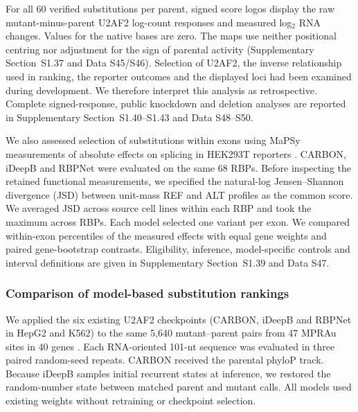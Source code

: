 \documentclass[webpdf,contemporary,large]{current_assets/oup-authoring-template}
\newcommand{\supsect}[1]{Supplementary Section~#1}
\begin{document}
For all 60 verified substitutions per parent, signed score logos \citep{dey2018edlogo} display the raw mutant-minus-parent U2AF2 log-count responses and measured log$_2$ RNA changes. Values for the native bases are zero. The maps use neither positional centring nor adjustment for the sign of parental activity (\supsect{S1.37} and Data S45/S46). Selection of U2AF2, the inverse relationship used in ranking, the reporter outcomes and the displayed loci had been examined during development. We therefore interpret this analysis as retrospective. Complete signed-response, public knockdown and deletion analyses are reported in \supsect{S1.40--S1.43} and Data S48--S50.

We also assessed selection of substitutions within exons using MaPSy measurements of absolute effects on splicing in HEK293T reporters \citep{soemedi2017mapsy,cheng2019mmsplice}. CARBON, iDeepB and RBPNet were evaluated on the same 68 RBPs. Before inspecting the retained functional measurements, we specified the natural-log Jensen--Shannon divergence (JSD) between unit-mass REF and ALT profiles as the common score. We averaged JSD across source cell lines within each RBP and took the maximum across RBPs. Each model selected one variant per exon. We compared within-exon percentiles of the measured effects with equal gene weights and paired gene-bootstrap contrasts. Eligibility, inference, model-specific controls and interval definitions are given in \supsect{S1.39} and Data S47.

\subsubsection{Comparison of model-based substitution rankings}\label{subsec:retrospective-model-comparison}

We applied the six existing U2AF2 checkpoints (CARBON, iDeepB and RBPNet in HepG2 and K562) to the same 5,640 mutant--parent pairs from 47 MPRAu sites in 40 genes \citep{griesemer2021mprau}. Each RNA-oriented 101-nt sequence was evaluated in three paired random-seed repeats. CARBON received the parental phyloP track. Because iDeepB samples initial recurrent states at inference, we restored the random-number state between matched parent and mutant calls. All models used existing weights without retraining or checkpoint selection.
\end{document}
